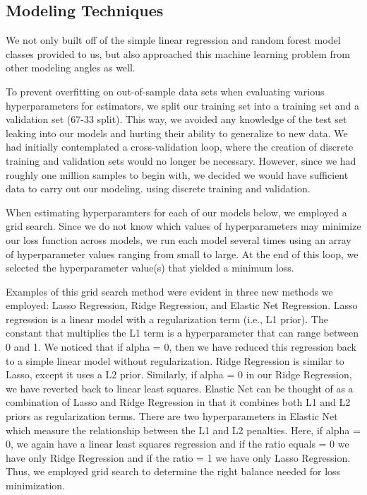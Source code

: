 \documentclass[11pt, oneside]{article}   	%
\begin{document}
\subsection{Modeling Techniques} 

We not only built off of the simple linear regression and random forest model classes provided to us, but also approached this machine learning problem from other modeling angles as well. 

To prevent overfitting on out-of-sample data sets when evaluating various hyperparameters for estimators, we split our training set into a training set and a validation set (67-33 split). This way, we avoided any knowledge of the test set leaking into our models and hurting their ability to generalize to new data. We had initially contemplated a cross-validation loop, where the creation of discrete training and validation sets would no longer be necessary. However, since we had roughly one million samples to begin with, we decided we would have sufficient data to carry out our modeling. using discrete training and validation.

When estimating hyperparamters for each of our models below, we employed a grid search. Since we do not know which values of hyperparameters may minimize our loss function across models, we run each model several times using an array of hyperparameter values ranging from small to large. At the end of this loop, we selected the hyperparameter value(s) that yielded a minimum loss. 

Examples of this grid search method were evident in three new methods we employed: Lasso Regression, Ridge Regression, and Elastic Net Regression. Lasso regression is a linear model with a regularization term (i.e., L1 prior). The constant that multiplies the L1 term is a hyperparameter that can range between 0 and 1. We noticed that if alpha = 0, then we have reduced this regression back to a simple linear model without regularization. Ridge Regression is similar to Lasso, except it uses a L2 prior. Similarly, if alpha = 0 in our Ridge Regression, we have reverted back to linear least squares. Elastic Net can be thought of as a combination of Lasso and Ridge Regression in that it combines both L1 and L2 priors as regularization terms. There are two hyperparameters in Elastic Net which measure the relationship between the L1 and L2 penalties. Here, if alpha = 0, we again have a linear least squares regression and if the ratio equals = 0 we have only Ridge Regression and if the ratio = 1 we have only Lasso Regression. Thus, we employed grid search to determine the right balance needed for loss minimization. 
\end{document}
